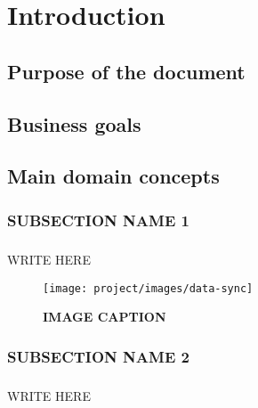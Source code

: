 \chapter{Introduction}
\section{Purpose of the document}
\section{Business goals}
\section{Main domain concepts}
\subsection{SUBSECTION NAME 1}
\paragraph{}WRITE HERE

\begin{figure}[H]
  \centering
    \texttt{[image: project/images/data-sync]}
  \caption{\textbf{IMAGE CAPTION}}
\end{figure}

\subsection{SUBSECTION NAME 2}
\paragraph{}WRITE HERE
